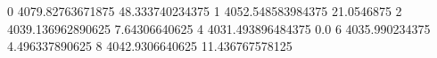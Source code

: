 0 4079.82763671875 48.333740234375
1 4052.548583984375 21.0546875
2 4039.136962890625 7.64306640625
4 4031.493896484375 0.0
6 4035.990234375 4.496337890625
8 4042.9306640625 11.436767578125
